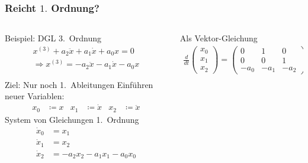 %
%
%
\bgroup
\begin{frame}[t]
\setlength{\abovedisplayskip}{5pt}
\setlength{\belowdisplayskip}{5pt}
\frametitle{Reicht $1.$ Ordnung?}
\vspace{-20pt}
\begin{columns}[t,onlytextwidth]
\begin{column}{0.48\textwidth}
\begin{block}{Beispiel: DGL 3.~Ordnung} \vspace*{-1ex}
  \begin{align*}
    x^{(3)} + a_2 \ddot x + a_1 \dot x + a_0 x = 0 \\
    \Rightarrow
     x^{(3)} = -a_2 \ddot x - a_1 \dot x - a_0 x
  \end{align*}
\end{block}
\begin{block}{Ziel: Nur noch 1.~Ableitungen}
  Einführen neuer Variablen:
    \begin{align*}
    x_0 &\coloneqq x &
    x_1 &\coloneqq \dot  x &
    x_2 &\coloneqq \ddot x
  \end{align*}
System von Gleichungen 1.~Ordnung
  \begin{align*}
  \dot x_0 &= x_1 \\
  \dot x_1 &= x_2 \\
  \dot x_2 &= -a_2 x_2 - a_1 x_1 - a_0 x_0
\end{align*}
\end{block}
\end{column}
\begin{column}{0.48\textwidth}
\begin{block}{Als Vektor-Gleichung} \vspace*{-1ex}
  \begin{align*}
    \frac{d}{dt}
    \begin{pmatrix} x_0 \\ x_1 \\ x_2 \end{pmatrix}
    = \begin{pmatrix}
      0     & 1     & 0   \\
      0     & 0     & 1   \\
      -a_0  & -a_1  & -a_2 
    \end{pmatrix}
    \begin{pmatrix} x_0 \\ x_1 \\ x_2 \end{pmatrix}    
  \end{align*}
\end{block}
\end{column}
\end{columns}
\end{frame}
\egroup

